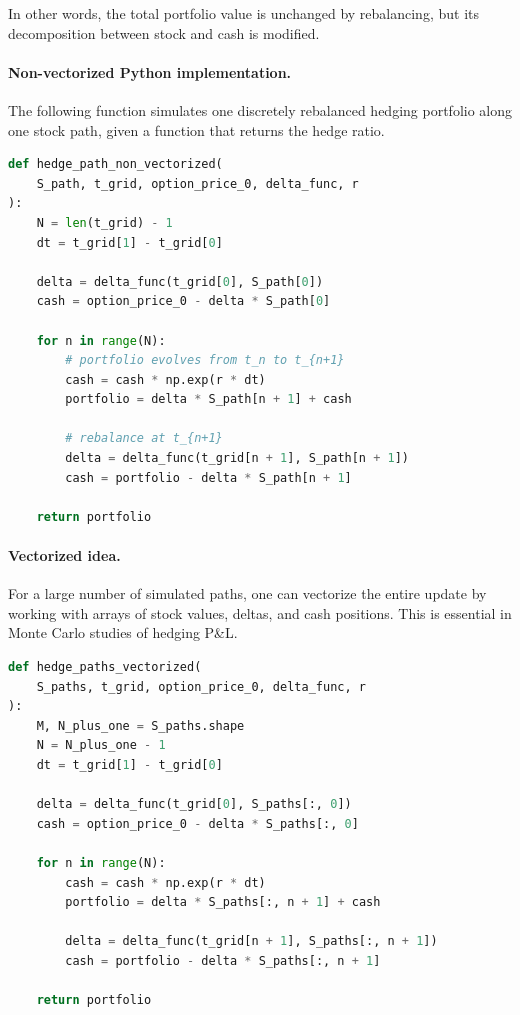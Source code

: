 \documentclass[11pt]{article}
\theoremstyle{plain}
\theoremstyle{definition}
\theoremstyle{remark}
\begin{document}
In other words, the total portfolio value is unchanged by rebalancing,
but its decomposition between stock and cash is modified.

\paragraph{Non-vectorized Python implementation.}
The following function simulates one discretely rebalanced hedging
portfolio along one stock path, given a function that returns the hedge
ratio.

\begin{lstlisting}[language=Python]
def hedge_path_non_vectorized(
    S_path, t_grid, option_price_0, delta_func, r
):
    N = len(t_grid) - 1
    dt = t_grid[1] - t_grid[0]

    delta = delta_func(t_grid[0], S_path[0])
    cash = option_price_0 - delta * S_path[0]

    for n in range(N):
        # portfolio evolves from t_n to t_{n+1}
        cash = cash * np.exp(r * dt)
        portfolio = delta * S_path[n + 1] + cash

        # rebalance at t_{n+1}
        delta = delta_func(t_grid[n + 1], S_path[n + 1])
        cash = portfolio - delta * S_path[n + 1]

    return portfolio
\end{lstlisting}

\paragraph{Vectorized idea.}
For a large number of simulated paths, one can vectorize the entire
update by working with arrays of stock values, deltas, and cash
positions.
This is essential in Monte Carlo studies of hedging P\&L.

\begin{lstlisting}[language=Python]
def hedge_paths_vectorized(
    S_paths, t_grid, option_price_0, delta_func, r
):
    M, N_plus_one = S_paths.shape
    N = N_plus_one - 1
    dt = t_grid[1] - t_grid[0]

    delta = delta_func(t_grid[0], S_paths[:, 0])
    cash = option_price_0 - delta * S_paths[:, 0]

    for n in range(N):
        cash = cash * np.exp(r * dt)
        portfolio = delta * S_paths[:, n + 1] + cash

        delta = delta_func(t_grid[n + 1], S_paths[:, n + 1])
        cash = portfolio - delta * S_paths[:, n + 1]

    return portfolio
\end{lstlisting}
\end{document}
